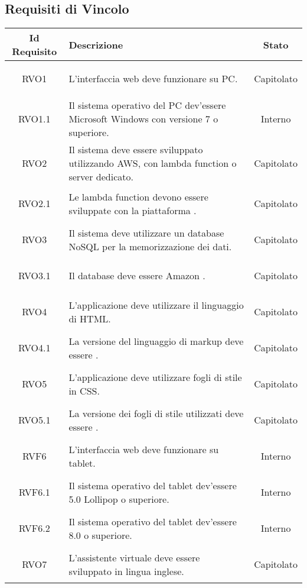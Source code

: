 \subsection{Requisiti di Vincolo}
\normalsize
\begin{longtable}{|c|>{\centering}m{7cm}|c|}
	\hline
	\textbf{Id Requisito} & \textbf{Descrizione} & \textbf{Stato}\\
	\hline
	\endhead\hypertarget{RVO1}{RVO1} & L'interfaccia web deve funzionare su PC. & Capitolato\\ \hline
	\hypertarget{RVO1.1}{RVO1.1} & Il sistema operativo del PC dev'essere Microsoft Windows con versione 7 o superiore. & Interno\\ \hline
	\hypertarget{RVO2}{RVO2} & Il sistema deve essere sviluppato utilizzando AWS, con lambda function o server dedicato. & Capitolato\\ \hline
	\hypertarget{RVO2.1}{RVO2.1} & Le lambda function devono essere sviluppate con la piattaforma \gl{Node.js}. & Capitolato\\ \hline
	\hypertarget{RVO3}{RVO3} & Il sistema deve utilizzare un database NoSQL per la memorizzazione dei dati. & Capitolato\\ \hline
	\hypertarget{RVO3.1}{RVO3.1} & Il database deve essere Amazon \gl{DynamoDB}. & Capitolato\\ \hline
	\hypertarget{RVO4}{RVO4} & L'applicazione deve utilizzare il linguaggio di \gl{markup} HTML. & Capitolato\\ \hline
	\hypertarget{RVO4.1}{RVO4.1} & La versione del linguaggio di markup deve essere \gl{HTML5}. & Capitolato\\ \hline
	\hypertarget{RVO5}{RVO5} & L’applicazione deve utilizzare fogli di stile in CSS. & Capitolato\\ \hline
	\hypertarget{RVO5.1}{RVO5.1} & La versione dei fogli di stile utilizzati deve essere \gl{CSS3}. & Capitolato\\ \hline
	\hypertarget{RVF6}{RVF6} & L'interfaccia web deve funzionare su tablet. & Interno\\ \hline
	\hypertarget{RVF6.1}{RVF6.1} & Il sistema operativo del tablet dev'essere \gl{Android} 5.0 Lollipop o superiore. & Interno\\ \hline
	\hypertarget{RVF6.2}{RVF6.2} & Il sistema operativo del tablet \gl{Apple} dev'essere 8.0 o superiore. & Interno\\ \hline
	\hypertarget{RVO7}{RVO7} & L'assistente virtuale deve essere sviluppato in lingua inglese. & Capitolato\\ \hline

\end{longtable}
